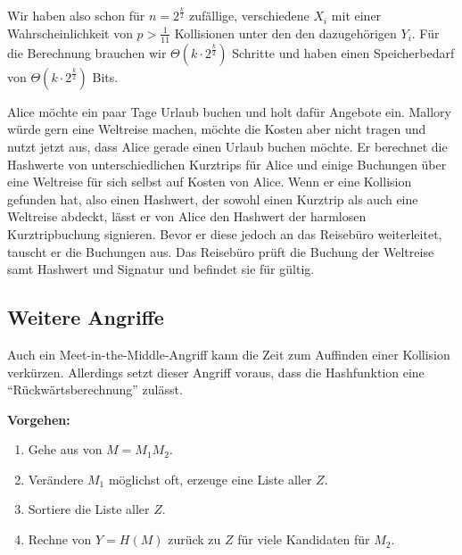 Wir haben also schon für $n = 2^{\frac{k}{2}}$ zufällige, verschiedene $X_i$ mit einer Wahrscheinlichkeit von $p > \frac{1}{11}$ Kollisionen unter den
den dazugehörigen $Y_i$. Für die Berechnung brauchen wir $\Theta(k \cdot 2^{\frac{k}{2}})$ Schritte und haben einen Speicherbedarf von $\Theta(k \cdot
2^{\frac{k}{2}})$ Bits.
\vspace{10pt}

\begin{beispiel}
Alice möchte ein paar Tage Urlaub buchen und holt dafür Angebote ein. Mallory würde gern eine Weltreise machen, möchte die Kosten aber nicht tragen und nutzt
jetzt aus, dass Alice gerade einen Urlaub buchen möchte. Er berechnet die Hashwerte von unterschiedlichen Kurztrips für Alice und einige Buchungen über
eine Weltreise für sich selbst auf Kosten von Alice. Wenn er eine Kollision gefunden hat, also einen Hashwert, der sowohl einen Kurztrip als auch eine
Weltreise abdeckt, lässt er von Alice den Hashwert der harmlosen Kurztripbuchung signieren. Bevor er diese jedoch an das Reisebüro weiterleitet, tauscht er die
Buchungen aus. Das Reisebüro prüft die Buchung der Weltreise samt Hashwert und Signatur und befindet sie für gültig.
\end{beispiel}

\subsection{Weitere Angriffe}
Auch ein Meet-in-the-Middle-Angriff kann die Zeit zum Auffinden einer Kollision verkürzen. Allerdings setzt dieser Angriff voraus, dass die
Hashfunktion eine "`Rückwärtsberechnung"' zulässt.
\vspace{10pt}

\textbf{Vorgehen:}
\begin{enumerate}
  \item Gehe aus von $M = M_1M_2$.
  \item Verändere $M_1$ möglichst oft, erzeuge eine Liste aller $Z$.
  \item Sortiere die Liste aller $Z$.
  \item Rechne von $Y=H(M)$ zurück zu $Z$ für viele Kandidaten für $M_2$.
\end{enumerate}

